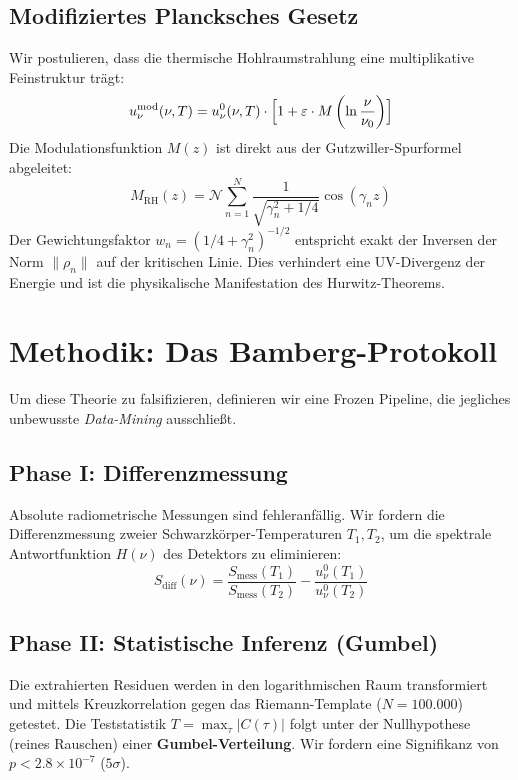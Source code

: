 \documentclass[11pt, a4paper]{article}
\begin{document}
	\subsection{Modifiziertes Plancksches Gesetz}
	Wir postulieren, dass die thermische Hohlraumstrahlung eine multiplikative Feinstruktur trägt:
	\begin{equation}
		u_\nu^{\text{mod}}(\nu,T) = u_\nu^{0}(\nu,T) \cdot \Bigl[ 1 + \varepsilon \cdot M\left(\ln\frac{\nu}{\nu_0}\right) \Bigr]
	\end{equation}
	Die Modulationsfunktion $M(z)$ ist direkt aus der Gutzwiller-Spurformel abgeleitet:
	\begin{equation}
		M_{\text{RH}}(z) = \mathcal{N} \sum_{n=1}^{N} \frac{1}{\sqrt{\gamma_n^2 + 1/4}} \cos(\gamma_n z)
	\end{equation}
	Der Gewichtungsfaktor $w_n = (1/4 + \gamma_n^2)^{-1/2}$ entspricht exakt der Inversen der Norm $\|\rho_n\|$ auf der kritischen Linie. Dies verhindert eine UV-Divergenz der Energie und ist die physikalische Manifestation des Hurwitz-Theorems.
	
	\section{Methodik: Das Bamberg-Protokoll}
	
	Um diese Theorie zu falsifizieren, definieren wir eine \glqq Frozen Pipeline\grqq, die jegliches unbewusste \textit{Data-Mining} ausschließt.
	
	\subsection{Phase I: Differenzmessung}
	
	Absolute radiometrische Messungen sind fehleranfällig. Wir fordern die Differenzmessung zweier Schwarzkörper-Temperaturen $T_1, T_2$, um die spektrale Antwortfunktion $H(\nu)$ des Detektors zu eliminieren:
	\begin{equation}
		S_{\text{diff}}(\nu) = \frac{S_{\text{mess}}(T_1)}{S_{\text{mess}}(T_2)} - \frac{u_\nu^0(T_1)}{u_\nu^0(T_2)}
	\end{equation}
	
	\subsection{Phase II: Statistische Inferenz (Gumbel)}
	Die extrahierten Residuen werden in den logarithmischen Raum transformiert und mittels Kreuzkorrelation gegen das Riemann-Template ($N=100.000$) getestet.
	Die Teststatistik $T = \max_\tau |C(\tau)|$ folgt unter der Nullhypothese (reines Rauschen) einer \textbf{Gumbel-Verteilung}.
	Wir fordern eine Signifikanz von $p < 2.8 \times 10^{-7}$ ($5\sigma$).
	
\end{document}
